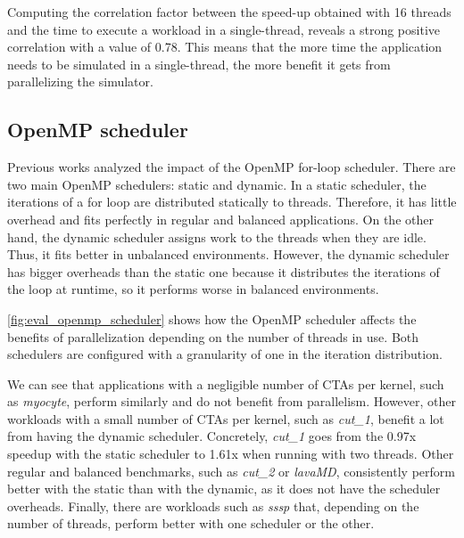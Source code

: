 \par
Computing the correlation factor between the speed-up obtained with 16 threads and the time to execute a workload in a single-thread, reveals a strong positive correlation with a value of 0.78. This means that the more time the application needs to be simulated in a single-thread, the more benefit it gets from parallelizing the simulator.

\subsection{OpenMP scheduler}

\par
Previous works \cite{ompScheduling1} \cite{ompScheduling2} analyzed the impact of the OpenMP for-loop scheduler. There are two main OpenMP schedulers: static and dynamic. In a static scheduler, the iterations of a for loop are distributed statically to threads. Therefore, it has little overhead and fits perfectly in regular and balanced applications. On the other hand, the dynamic scheduler assigns work to the threads when they are idle. Thus, it fits better in unbalanced environments. However, the dynamic scheduler has bigger overheads than the static one because it distributes the iterations of the loop at runtime, so it performs worse in balanced environments.

\par
\autoref{fig:eval_openmp_scheduler} shows how the OpenMP scheduler affects the benefits of parallelization depending on the number of threads in use. Both schedulers are configured with a granularity of one in the iteration distribution.

\par
We can see that applications with a negligible number of CTAs per kernel, such as \textit{myocyte}, perform similarly and do not benefit from parallelism. However, other workloads with a small number of CTAs per kernel, such as \textit{cut\_1}, benefit a lot from having the dynamic scheduler. Concretely, \textit{cut\_1} goes from the 0.97x speedup with the static scheduler to 1.61x when running with two threads. Other regular and balanced benchmarks, such as \textit{cut\_2} or \textit{lavaMD}, consistently perform better with the static than with the dynamic, as it does not have the scheduler overheads. Finally, there are workloads such as \textit{sssp} that, depending on the number of threads, perform better with one scheduler or the other. 

